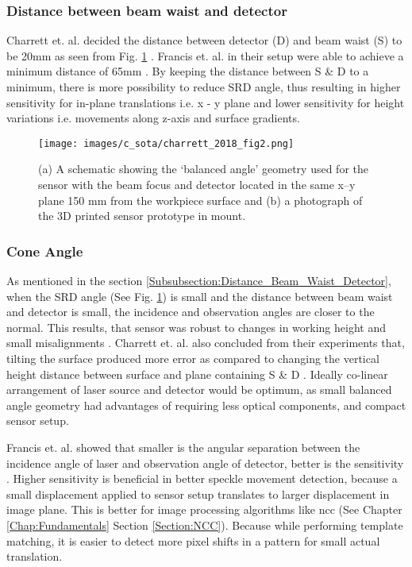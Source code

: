     \subsubsection*{Distance between beam waist and detector}\label{Subsubsection:Distance_Beam_Waist_Detector}
    Charrett et. al. decided the distance between detector (D) and beam waist (S) to be 20mm as seen from Fig. \ref{fig:charrett_2018_fig2} \cite{charrett_2018}. Francis et. al. in their setup were able to achieve a minimum distance of 65mm \cite{francis_autonomous}. By keeping the distance between S \& D to a minimum, there is more possibility to reduce SRD angle, thus resulting in higher sensitivity for in-plane translations i.e. x - y plane and lower sensitivity for height variations i.e. movements along z-axis and surface gradients.

    \begin{figure}[h]
        \centering
        \texttt{[image: images/c\_sota/charrett\_2018\_fig2.png]}
        \caption{(a) A schematic showing the ‘balanced angle’ geometry used for the sensor with the beam focus and detector located in the same x–y plane 150 mm from the workpiece surface and (b) a photograph of the 3D printed sensor prototype in mount. \cite{charrett_2018}}
        \label{fig:charrett_2018_fig2}
    \end{figure}


    \subsubsection*{Cone Angle}
    As mentioned in the section \ref{Subsubsection:Distance_Beam_Waist_Detector}, when the SRD angle (See Fig. \ref{fig:charrett_2018_fig2}) is small and the distance between beam waist and detector is small, the incidence and observation angles are closer to the normal. This results, that sensor was robust to changes in working height and small misalignments \cite{charrett_2018}. Charrett et. al. also concluded from their experiments that, tilting the surface produced more error as compared to changing the vertical height distance between surface and plane containing S \& D \cite{charrett_2018}. Ideally co-linear arrangement of laser source and detector would be optimum, as small balanced angle geometry had advantages of requiring less optical components, and compact sensor setup.
    
    \vspace{5mm}

    \noindent Francis et. al. showed that smaller is the angular separation between the incidence angle of laser and observation angle of detector, better is the sensitivity \cite{francis_autonomous}. Higher sensitivity is beneficial in better speckle movement detection, because a small displacement applied to sensor setup translates to larger displacement in image plane. This is better for image processing algorithms like \gls{ncc} (See Chapter \ref{Chap:Fundamentals} Section \ref{Section:NCC}). Because while performing template matching, it is easier to detect more pixel shifts in a pattern for small actual translation.
    
